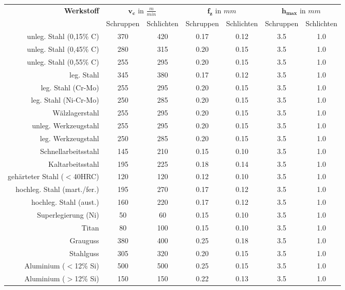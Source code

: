 \documentclass{\basedir/fablab-document}
\newcommand{\mcc}[1]{\multicolumn{2}{c}{#1}}
\begin{document}
\begin{tabular}{rcccccc}
  \textbf{Werkstoff}  & \mcc{$\mathbf{v_c} \textrm{ in } \frac{m}{min} $} & \mcc{$\mathbf{f_z} \textrm{ in } mm$} & \mcc{$\mathbf{h_{max}} \textrm{ in } mm$} \\ \addlinespace \toprule
															& Schruppen 	& Schlichten 	& Schruppen 	& Schlichten 	& Schruppen 	& Schlichten		\\ \toprule
  unleg. Stahl (0,15\% C)			& 370 	& 420  	& 0.17 	& 0.12	& 3.5 	& 1.0 	\\
  unleg. Stahl (0,45\% C)			& 280 	& 315  	& 0.20 	& 0.15	& 3.5 	& 1.0 	\\
  unleg. Stahl (0,55\% C)			& 255 	& 295  	& 0.20 	& 0.15	& 3.5 	& 1.0 	\\
	leg. Stahl									& 345 	& 380  	& 0.17 	& 0.12	& 3.5 	& 1.0 	\\
	leg. Stahl (Cr-Mo)					& 255 	& 295  	& 0.20 	& 0.15	& 3.5 	& 1.0 	\\	
	leg. Stahl (Ni-Cr-Mo)				& 250 	& 285  	& 0.20 	& 0.15	& 3.5 	& 1.0 	\\
	Wälzlagerstahl							& 255 	& 295  	& 0.20 	& 0.15	& 3.5 	& 1.0 	\\
	unleg. Werkzeugstahl				& 255 	& 295  	& 0.20 	& 0.15	& 3.5 	& 1.0 	\\	
	leg. Werkzeugstahl					& 250 	& 285  	& 0.20 	& 0.15	& 3.5 	& 1.0 	\\	
	Schnellarbeitsstahl					& 145 	& 210  	& 0.15 	& 0.10	& 3.5 	& 1.0 	\\	
	Kaltarbeitsstahl						& 195 	& 225  	& 0.18 	& 0.14	& 3.5 	& 1.0 	\\	
	gehärteter Stahl ($<$40HRC)	& 120 	& 120  	& 0.12 	& 0.10	& 3.5 	& 1.0 	\\	
	hochleg. Stahl	(mart./fer.)& 195 	& 270  	& 0.17 	& 0.12	& 3.5 	& 1.0 	\\
	hochleg. Stahl	(aust.)			& 160 	& 220  	& 0.17 	& 0.12	& 3.5 	& 1.0 	\\
	Superlegierung (Ni)					& 50	 	& 60  	& 0.15 	& 0.10	& 3.5 	& 1.0 	\\
	Titan												& 80	 	& 100  	& 0.15 	& 0.10	& 3.5 	& 1.0 	\\
	Grauguss										& 380	 	& 400  	& 0.25 	& 0.18	& 3.5 	& 1.0 	\\
	Stahlguss										& 305	 	& 320  	& 0.20 	& 0.15	& 3.5 	& 1.0 	\\
	Aluminium	($<$12\% Si)			& 500	 	& 500  	& 0.25 	& 0.15	& 3.5 	& 1.0 	\\
	Aluminium	($>$12\% Si)			& 150	 	& 150  	& 0.22 	& 0.13	& 3.5 	& 1.0 	\\

\end{tabular}
\end{document}
